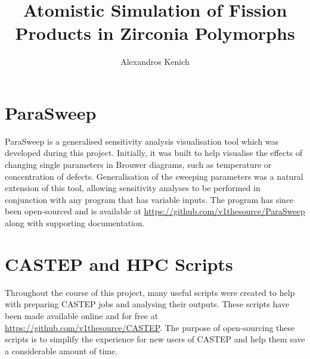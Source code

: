 \documentclass[a4paper,12pt,twoside]{report}
\begin{document}

\title{\LARGE {\bf Atomistic Simulation of Fission Products in Zirconia Polymorphs}
}

\author{Alexandros Kenich}

\normallinespacing
\maketitle



\preface
%
%

\body

\doublespacing



\label{References}
\renewcommand\bibname{References}



\appendix
\label{Appendix}

\chapter{ParaSweep}

ParaSweep is a generalised sensitivity analysis visualisation tool which was developed during this project. Initially, it was built to help visualise the effects of changing single parameters in Brouwer diagrams, such as temperature or concentration of defects. Generalisation of the sweeping parameters was a natural extension of this tool, allowing sensitivity analyses to be performed in conjunction with any program that has variable inputs. The program has since been open-sourced and is available at \href{https://github.com/v1thesource/ParaSweep}{https://github.com/v1thesource/ParaSweep} along with supporting documentation.

\chapter{CASTEP and HPC Scripts}
\label{castep_scripts}

Throughout the course of this project, many useful scripts were created to help with preparing CASTEP jobs and analysing their outputs. These scripts have been made available online and for free at \href{https://github.com/v1thesource/CASTEP}{https://github.com/v1thesource/CASTEP}. The purpose of open-sourcing these scripts is to simplify the experience for new users of CASTEP and help them save a considerable amount of time.
\end{document}
